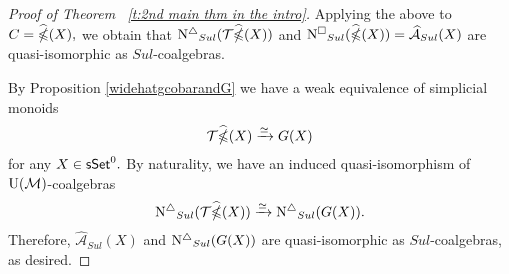 \begin{proof}[Proof of Theorem ~\ref{t:2nd main thm in the intro}]
Applying the above to $C= \widehat{\operatorname{\mathbb{\Omega}}}(X),$ we obtain that $\operatorname{N^{\triangle}}_{Sul} (\mathcal{T} \widehat{\operatorname{\mathbb{\Omega}}}(X))$ and $\operatorname{N^{\square}}_{Sul}(\widehat{\operatorname{\mathbb{\Omega}}}(X)) = \widehat{\mathcal{A}}_{Sul}(X)$ are quasi-isomorphic as $Sul$-coalgebras. 

By Proposition \ref{widehatgcobarandG} we have a weak equivalence of simplicial monoids
$$\mathcal{T}\widehat{\operatorname{\mathbb{\Omega}}}(X) \xrightarrow{\simeq} G(X)$$ for any $X \in \mathsf{sSet}^0.$ By naturality, we have an induced quasi-isomorphism of ${\mathrm{U}(\mathcal{M})}$-coalgebras
$$\operatorname{N^{\triangle}}_{Sul}(\mathcal{T}\widehat{\operatorname{\mathbb{\Omega}}}(X)) \xrightarrow{\simeq} \operatorname{N^{\triangle}}_{Sul}(G(X)).$$
Therefore, $\widehat{\mathcal{A}}_{Sul}(X)$ and $\operatorname{N^{\triangle}}_{Sul}(G(X))$ are quasi-isomorphic as $Sul$-coalgebras, as desired. 




\end{proof}